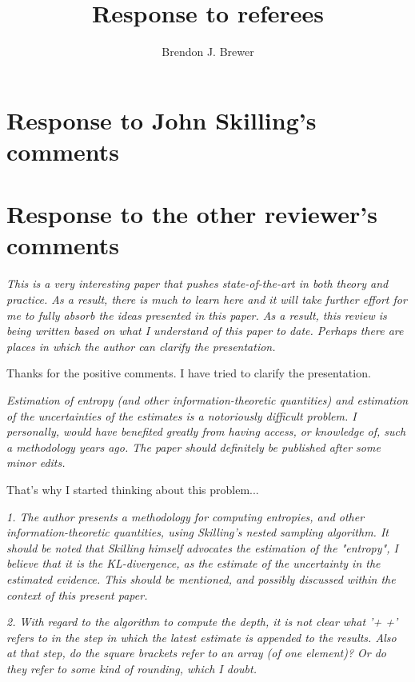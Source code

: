 \documentclass[a4paper, 12pt]{article}
\title{Response to referees}
\author{Brendon J. Brewer}
\date{}
\renewcommand{\quote}{\em}
\begin{document}
\maketitle


\setlength{\parindent}{0pt}
\setlength{\parskip}{8pt}

\section*{Response to John Skilling's comments}


\section*{Response to the other reviewer's comments}

{\quote
This is a very interesting paper that pushes state-of-the-art in both theory and practice.  As a result, there is much to learn here and it will take further effort for me to fully absorb the ideas presented in this paper.  As a result, this review is being written based on what I understand of this paper to date.  Perhaps there are places in which the author can clarify the presentation.}

Thanks for the positive comments. I have tried to clarify the presentation.

{\quote
Estimation of entropy (and other information-theoretic quantities) and estimation of the uncertainties of the estimates is a notoriously difficult problem.  I personally, would have benefited greatly from having access, or knowledge of, such a methodology years ago.  The paper should definitely be published after some minor edits.}

That's why I started thinking about this problem...

{\quote
1. The author presents a methodology for computing entropies, and other information-theoretic quantities, using Skilling's nested sampling algorithm.  It should be noted that Skilling himself advocates the estimation of the "entropy", I believe that it is the KL-divergence, as the estimate of the uncertainty in the estimated evidence.  This should be mentioned, and possibly discussed within the context of this present paper.}

{\quote
2. With regard to the algorithm to compute the depth, it is not clear what '+ +' refers to in the step in which the latest estimate is appended to the results.  Also at that step, do the square brackets refer to an array (of one element)?  Or do they refer to some kind of rounding, which I doubt.}
\end{document}
